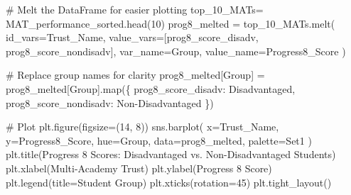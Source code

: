 \documentclass[
  letterpaper,
  DIV=11,
  numbers=noendperiod]{scrartcl}
\newenvironment{Shaded}{\begin{snugshade}}{\end{snugshade}}
\newcommand{\BuiltInTok}[1]{\textcolor[rgb]{0.00,0.23,0.31}{#1}}
\newcommand{\CommentTok}[1]{\textcolor[rgb]{0.37,0.37,0.37}{#1}}
\newcommand{\DecValTok}[1]{\textcolor[rgb]{0.68,0.00,0.00}{#1}}
\newcommand{\NormalTok}[1]{\textcolor[rgb]{0.00,0.23,0.31}{#1}}
\newcommand{\OperatorTok}[1]{\textcolor[rgb]{0.37,0.37,0.37}{#1}}
\newcommand{\StringTok}[1]{\textcolor[rgb]{0.13,0.47,0.30}{#1}}
\begin{document}
\begin{Shaded}
\begin{Highlighting}[]
\CommentTok{\# Melt the DataFrame for easier plotting}
\NormalTok{top\_10\_MATs}\OperatorTok{=}\NormalTok{ MAT\_performance\_sorted.head(}\DecValTok{10}\NormalTok{)}
\NormalTok{prog8\_melted }\OperatorTok{=}\NormalTok{ top\_10\_MATs.melt(}
\NormalTok{    id\_vars}\OperatorTok{=}\StringTok{\textquotesingle{}Trust\_Name\textquotesingle{}}\NormalTok{, }
\NormalTok{    value\_vars}\OperatorTok{=}\NormalTok{[}\StringTok{\textquotesingle{}prog8\_score\_disadv\textquotesingle{}}\NormalTok{, }\StringTok{\textquotesingle{}prog8\_score\_nondisadv\textquotesingle{}}\NormalTok{],}
\NormalTok{    var\_name}\OperatorTok{=}\StringTok{\textquotesingle{}Group\textquotesingle{}}\NormalTok{,}
\NormalTok{    value\_name}\OperatorTok{=}\StringTok{\textquotesingle{}Progress8\_Score\textquotesingle{}}
\NormalTok{)}

\CommentTok{\# Replace group names for clarity}
\NormalTok{prog8\_melted[}\StringTok{\textquotesingle{}Group\textquotesingle{}}\NormalTok{] }\OperatorTok{=}\NormalTok{ prog8\_melted[}\StringTok{\textquotesingle{}Group\textquotesingle{}}\NormalTok{].}\BuiltInTok{map}\NormalTok{(\{}
    \StringTok{\textquotesingle{}prog8\_score\_disadv\textquotesingle{}}\NormalTok{: }\StringTok{\textquotesingle{}Disadvantaged\textquotesingle{}}\NormalTok{,}
    \StringTok{\textquotesingle{}prog8\_score\_nondisadv\textquotesingle{}}\NormalTok{: }\StringTok{\textquotesingle{}Non{-}Disadvantaged\textquotesingle{}}
\NormalTok{\})}

\CommentTok{\# Plot}
\NormalTok{plt.figure(figsize}\OperatorTok{=}\NormalTok{(}\DecValTok{14}\NormalTok{, }\DecValTok{8}\NormalTok{))}
\NormalTok{sns.barplot(}
\NormalTok{    x}\OperatorTok{=}\StringTok{\textquotesingle{}Trust\_Name\textquotesingle{}}\NormalTok{, }
\NormalTok{    y}\OperatorTok{=}\StringTok{\textquotesingle{}Progress8\_Score\textquotesingle{}}\NormalTok{, }
\NormalTok{    hue}\OperatorTok{=}\StringTok{\textquotesingle{}Group\textquotesingle{}}\NormalTok{, }
\NormalTok{    data}\OperatorTok{=}\NormalTok{prog8\_melted, }
\NormalTok{    palette}\OperatorTok{=}\StringTok{\textquotesingle{}Set1\textquotesingle{}}
\NormalTok{)}
\NormalTok{plt.title(}\StringTok{\textquotesingle{}Progress 8 Scores: Disadvantaged vs. Non{-}Disadvantaged Students\textquotesingle{}}\NormalTok{)}
\NormalTok{plt.xlabel(}\StringTok{\textquotesingle{}Multi{-}Academy Trust\textquotesingle{}}\NormalTok{)}
\NormalTok{plt.ylabel(}\StringTok{\textquotesingle{}Progress 8 Score\textquotesingle{}}\NormalTok{)}
\NormalTok{plt.legend(title}\OperatorTok{=}\StringTok{\textquotesingle{}Student Group\textquotesingle{}}\NormalTok{)}
\NormalTok{plt.xticks(rotation}\OperatorTok{=}\DecValTok{45}\NormalTok{)}
\NormalTok{plt.tight\_layout()}


\end{Highlighting}
\end{Shaded}
\end{document}
